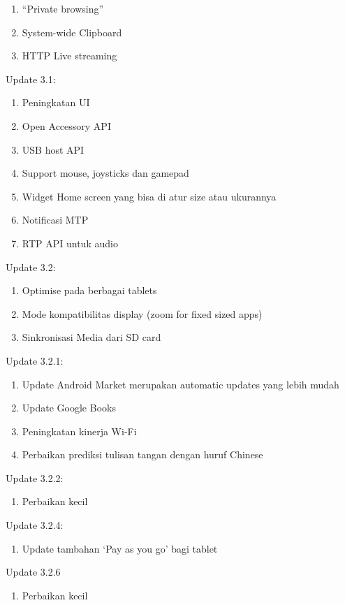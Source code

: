 \begin{enumerate}
\begin{enumerate}
    \item “Private browsing”
    \item System-wide Clipboard
    \item HTTP Live streaming
\end{enumerate}
Update 3.1:
\begin{enumerate}
    \item Peningkatan UI
    \item Open Accessory API
    \item USB host API
    \item Support mouse, joysticks dan gamepad
    \item Widget Home screen yang bisa di atur size atau ukurannya
    \item Notificasi MTP
    \item RTP API untuk audio
\end{enumerate}
Update 3.2:
\begin{enumerate}
    \item Optimise pada berbagai tablets
    \item Mode kompatibilitas display (zoom for fixed sized apps)
    \item Sinkronisasi Media dari SD card
\end{enumerate}
Update 3.2.1:
\begin{enumerate}
    \item Update Android Market merupakan automatic updates yang lebih mudah
    \item Update Google Books
    \item Peningkatan kinerja Wi-Fi
    \item Perbaikan prediksi tulisan tangan dengan huruf Chinese
\end{enumerate}
Update 3.2.2:
\begin{enumerate}
    \item Perbaikan kecil
\end{enumerate}
Update 3.2.4:
\begin{enumerate}
    \item Update tambahan ‘Pay as you go’ bagi tablet
\end{enumerate}
Update 3.2.6
\begin{enumerate}
    \item Perbaikan kecil 
\end{enumerate}


\end{enumerate}
